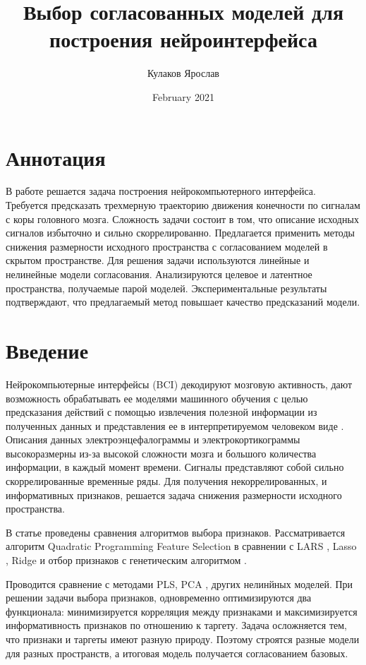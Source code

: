 \documentclass{article}
\title{Выбор согласованных моделей для построения нейроинтерфейса}
\author{Кулаков Ярослав}
\date{February 2021}
\begin{document}
\maketitle




\section{Аннотация}
В работе решается задача построения нейрокомпьютерного интерфейса. Требуется предсказать трехмерную траекторию движения конечности по сигналам с коры головного мозга. Сложность задачи состоит в том, что описание исходных сигналов избыточно и сильно скоррелированно. Предлагается применить методы снижения размерности исходного пространства с согласованием моделей в скрытом пространстве. Для решения задачи используются линейные и нелинейные модели согласования. Анализируются целевое и латентное пространства, получаемые парой моделей. Экспериментальные результаты подтверждают, что предлагаемый метод повышает качество предсказаний модели.

\section{Введение}
Нейрокомпьютерные интерфейсы (BCI) декодируют мозговую активность, дают возможность обрабатывать ее моделями машинного обучения с целью предсказания действий с помощью извлечения полезной информации из полученных данных и представления ее в интерпретируемом человеком виде \cite{general_purpose_1300799} \cite{BLANKERTZ20101303}. Описания данных электроэнцефалограммы и электрокортикограммы высокоразмерны из-за высокой сложности мозга и большого количества информации, в каждый момент времени. Сигналы представляют собой сильно скоррелированные временные ряды. Для получения некоррелированных, и информативных признаков, решается задача снижения размерности исходного пространства.\cite{feature_selection_ecog} \cite{ATYABI2013319} \cite{7330455} \par

В статье \cite{qpfs} проведены сравнения алгоритмов выбора признаков. Рассматривается алгоритм Quadratic Programming Feature Selection  \cite{qpfs} в сравнении с LARS \cite{MICHE20112413}, Lasso \cite{zhao2007stagewise}, Ridge \cite{ridge} и отбор признаков с генетическим алгоритмом \cite{tan2008genetic}. \par
Проводится сравнение с методами PLS, PCA\cite{abdi2003pls} \cite{wegelin2000survey}, других нелинйных моделей.  При решении задачи выбора признаков, одновременно оптимизируются два функционала: минимизируется корреляция между признаками и максимизируется информативность признаков по отношению к таргету. Задача осложняется тем, что признаки и таргеты имеют разную природу. Поэтому строятся разные модели для разных пространств, а итоговая модель получается согласованием базовых.
\end{document}
